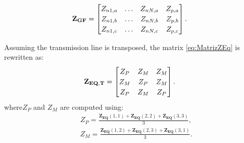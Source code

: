 \documentclass[conference]{IEEEtran}
\begin{document}
\begin{equation}\label{eq:MatrizGF}
	\begin{aligned}
		\arraycolsep=0.8pt %
		\medmuskip = -2mu %
		\def\arraystretch{1.2}
		&\mathbf{Z_{GF}}
		=
		\begin{bmatrix}
			Z_{n1,a} & \ldots & Z_{nN,a} & Z_{p,a}  \\
			Z_{n1,b} & \ldots & Z_{nN,b} & Z_{p,b} \\
			Z_{n1,c} & \ldots & Z_{nN,c} & Z_{p,c} \\
		\end{bmatrix}.
	\end{aligned} 
\end{equation}

Assuming the transmission line is transposed, the matrix \eqref{eq:MatrizZEq} is rewritten as:
\begin{equation}\label{eq:MatrizTransp}
	\begin{aligned}
		\arraycolsep=0.8pt %
		\medmuskip = -2mu %
		\def\arraystretch{1.2}
		&\mathbf{Z_{EQ,T}}
		=
		\begin{bmatrix}
			Z_{P} & Z_{M} & Z_{M}  \\
			Z_{M} & Z_{P} & Z_{M} \\
			Z_{P} & Z_{M} & Z_{P} \\
		\end{bmatrix}.
	\end{aligned} 
\end{equation}
where$Z_{P}$ and $Z_{M}$ are computed using:
\begin{equation}\label{eq:scalarZP}
	\begin{aligned}
		&Z_{P}=\frac{\mathbf{Z_{EQ}}(1,1)+\mathbf{Z_{EQ}}(2,2)+\mathbf{Z_{EQ}}(3,3)}{3},
	\end{aligned}
\end{equation}
\begin{equation}\label{eq:scalarZM}
	\begin{aligned}
		&Z_{M}=\frac{\mathbf{Z_{EQ}}(1,2)+\mathbf{Z_{EQ}}(2,3)+\mathbf{Z_{EQ}}(3,1)}{3}.
	\end{aligned}
\end{equation}
\end{document}
